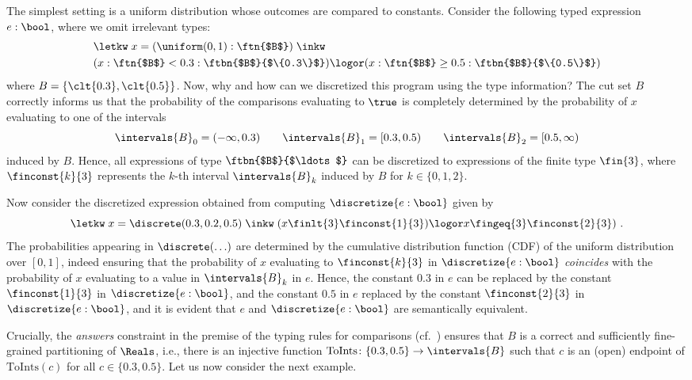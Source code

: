 \begin{example}
	\label{ex:discretize_simple}
The simplest setting is a uniform distribution whose outcomes are compared to constants. Consider the following typed expression $e: \bool$, where we omit irrelevant types:
%
%
\begin{align*}
	&\letkw\; x = (\uniform(0, 1) : \text{\ftn{$B$}})\; \inkw\; \\
	&(x : \text{\ftn{$B$}} < 0.3 : \text{\ftbn{$B$}{$\{0.3\}$}}) \logor (x : \text{\ftn{$B$}} \geq 0.5 : \text{\ftbn{$B$}{$\{0.5\}$}})
\end{align*}
%
where $B= \{ \clt{0.3},\clt{0.5} \}$. Now, why and how can we discretized this program using the type information? The cut set $B$ correctly informs us that the probability of the comparisons evaluating to $\true$ is completely determined by the probability of $x$ evaluating to one of the intervals 
%
\[
	\intervals{B}_0 = (-\infty, 0.3) 
	\qquad 
	\intervals{B}_1 =[0.3, 0.5) 
	\qquad 
	\intervals{B}_2 =[0.5, \infty)
\]
%
induced by $B$. Hence, all expressions of type $\text{\ftbn{$B$}{$\ldots$}}$ can be discretized to expressions of the finite type $\fin{3}$, where $\finconst{k}{3}$ represents the $k$-th interval $\intervals{B}_k$ induced by $B$ for $k \in \{0,1,2\}$. 

Now consider the discretized expression obtained from computing $\discretize{e: \bool}$ given by 
%
\[
	\letkw\; x = \discrete(0.3, 0.2, 0.5)\; \inkw\; 
	(x \finlt{3} \finconst{1}{3})  \logor x  \fingeq{3} \finconst{2}{3})~.
\]
%
The probabilities appearing in $\discrete(\ldots)$ are determined by the cumulative distribution function (CDF) of the uniform distribution over $[0,1]$, indeed ensuring that the probability of $x$ evaluating to $\finconst{k}{3}$ in $\discretize{e: \bool}$ \emph{coincides} with the probability of $x$ evaluating to a value in $\intervals{B}_k$ in $e$. Hence, the constant $0.3$ in $e$ can be replaced by the constant $\finconst{1}{3}$ in $\discretize{e: \bool}$, and the constant $0.5$ in $e$ replaced by the constant $\finconst{2}{3}$ in $\discretize{e: \bool}$, and it is evident that $e$ and $\discretize{e: \bool}$ are semantically equivalent. 
\end{example}
%
Crucially, the \emph{answers} constraint in the premise of the typing rules for comparisons (cf.\ ) ensures that $B$ is a correct and sufficiently fine-grained partitioning of $\Reals$, i.e., there is an injective function
%
$
	\text{ToInts} \colon \{0.3, 0.5\} \to \intervals{B}
$
%
such that $c$ is an (open) endpoint of  $\text{ToInts}(c)$ for all $c \in\{0.3,0.5\}$. Let us now consider the next example.
